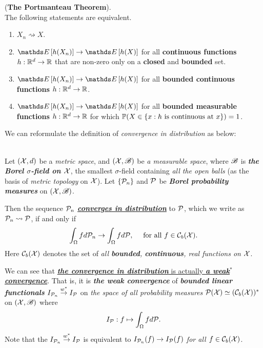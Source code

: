 \documentclass[11pt]{article}
\begin{document}
\begin{itemize}
\begin{example}
\begin{theorem} (\textbf{The Portmanteau Theorem}).  \citep{van2000asymptotic}\\
 The following statements are equivalent.
 \begin{enumerate}
 \item $X_n \rightsquigarrow X$.
 \item $\E{}{h(X_n)} \rightarrow \E{}{h(X)}$ for all \textbf{continuous functions} $h: {\mathbb R}^d \rightarrow {\mathbb R}$ that are non-zero only on a \textbf{closed} and \textbf{bounded} set.
 \item $\E{}{h(X_n)} \rightarrow \E{}{h(X)}$ for all \textbf{bounded continuous functions} $h: {\mathbb R}^d \rightarrow {\mathbb R}$.
 \item $\E{}{h(X_n)} \rightarrow \E{}{h(X)}$ for all \textbf{bounded measurable functions} $h: {\mathbb R}^d \rightarrow {\mathbb R}$ for which ${\mathbb P}(X \in \{x: h\text{ is continuous at }x\})=1$.
 \end{enumerate}
\end{theorem}

We can reformulate the definition of \emph{convergence in distribution} as below:
\begin{definition} \citep{wellner2013weak}\\
Let $({\mathcal X}, d)$ be a \emph{metric space}, and $({\mathcal X}, {\mathscr B})$ be \emph{a measurable space}, where ${\mathscr B}$ is \emph{\textbf{the Borel $\sigma$-field on ${\mathcal X}$}}, the smallest $\sigma$-field containing \emph{all the open balls} (as the basis of \emph{metric topology} on ${\mathcal X}$). Let $\{{\mathcal P}_n \}$ and ${\mathcal P}$ be \emph{\textbf{Borel probability measures}} on $({\mathcal X}, {\mathscr B})$.

Then the sequence ${\mathcal P}_n$ \underline{\emph{\textbf{converges in distribution}}} to ${\mathcal P}$, which we write as ${\mathcal P}_n \rightsquigarrow {\mathcal P}$, if and only if
\begin{align*}
\int_{\Omega} f d{\mathcal P}_n \rightarrow \int_{\Omega} f d{\mathcal P}, \quad \text{ for all } f \in {\mathcal C}_{b}({\mathcal X}).
\end{align*}
Here ${\mathcal C}_{b}({\mathcal X})$ denotes the set of \emph{all \textbf{bounded}, \textbf{continuous}, real functions on ${\mathcal X}$}.
\end{definition} 
We can see that \underline{\emph{\textbf{the convergence in distribution}} is actually \emph{\textbf{a weak$^{*}$ convergence}}}. That is, it is \emph{\textbf{the weak convergence}} of  \emph{\textbf{bounded linear functionals}} $I_{{\mathcal P}_n} \stackrel{w^{*}}{\rightarrow} I_{{\mathcal P}}$ on \emph{the space of all probability measures} ${\mathcal P}({\mathcal X}) \simeq ({\mathcal C}_{b}({\mathcal X}))^{*}$ on $({\mathcal X}, {\mathscr B})$ where 
\begin{align*}
I_{{\mathcal P}}: f \mapsto \int_{\Omega} f d{\mathcal P}.
\end{align*} Note that the $I_{{\mathcal P}_n} \stackrel{w^{*}}{\rightarrow} I_{{\mathcal P}}$ is equivalent to $I_{{\mathcal P}_n}(f) \rightarrow I_{{\mathcal P}}(f)$ \emph{for all $f \in  {\mathcal C}_{b}({\mathcal X})$}.


\end{example}
\end{itemize}
\end{document}
